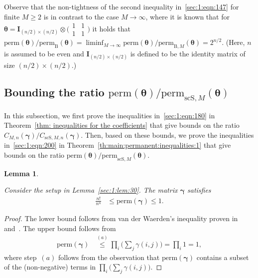 \documentclass[journal,lettersize,twocolumn]{IEEEtran} %
\newtheorem{lemma}[theorem]{Lemma}
\newcommand{\vect}[1]{ \bm{#1} }
\newcommand{\vgam}{ \vect{\gamma} }
\newcommand{\matr}[1]{ \bm{#1} }
\newcommand{\perm}{ \mathrm{perm} }
\newcommand{\permb}{ \mathrm{perm}_{\mathrm{B}} }
\newcommand{\permbM}[1]{\perm_{ \mathrm{B}, #1 }}
\newcommand{\permscsM}[1]{ \mathrm{perm}_{\mathrm{scS},#1} }
\newcommand{\CM}[1]{\Cgen{M}{#1}}
\newcommand{\Cgen}[2]{C_{#1,#2}}
\newcommand{\CscSgen}[2]{C_{\mathrm{scS},#1,#2}}
\newcommand{\mtheta}{\matr{\theta}}
\begin{document}
%

Observe that the non-tightness of the second inequality
in~\eqref{sec:1:eqn:147} for finite $M \geq 2$ is in contrast to the case
$M \to \infty$, where it is known that for
$\mtheta = \matr{I}_{(n/2) \times (n/2)} \otimes \bigl( \begin{smallmatrix} 1
  & 1 \\ 1 & 1 \end{smallmatrix} \bigr)$ it holds that
$\perm(\mtheta) / \permb(\mtheta) = \liminf_{M \to \infty} \perm(\mtheta) /
\permbM{M}(\mtheta)= 2^{n/2}$. (Here, $n$ is assumed to be even and
$\matr{I}_{(n/2) \times (n/2)}$ is defined to be the identity matrix of size
$(n/2) \times (n/2)$.)

%
%

\subsection{\texorpdfstring{Bounding the ratio $\perm(\mtheta) /  
                                                                                     \permscsM{M}(\mtheta)$}{}}

%

In this subsection, we first prove the inequalities in~\eqref{sec:1:eqn:180}
in Theorem~\ref{thm: inequalities for the coefficients} that give bounds on
the ratio $\CM{n}(\vgam) / \CscSgen{M}{n}(\vgam)$. Then, based on these
bounds, we prove the inequalities in~\eqref{sec:1:eqn:200} in
Theorem~\ref{th:main:permanent:inequalities:1} that give bounds on the ratio
$\perm(\mtheta) / \permscsM{M}(\mtheta)$.

%

\begin{lemma}
  \label{sec:1:lem:36}

  Consider the setup in Lemma~\ref{sec:1:lem:30}. The matrix $\vgam$ satisfies
  \begin{align*}
    \frac{n!}{n^{n}}
      &\leq 
         \perm(\vgam)
       \leq 1.
  \end{align*}
\end{lemma}

%

\begin{proof}
  The lower bound follows from van der Waerden's inequality proven
  in~\cite[Theorem 1]{Egorychev1981} and~\cite[Theorem 1]{Falikman1981}. The
  upper bound follows from
  \begin{align*}
    \perm(\vgam) 
      &\overset{(a)}{\leq }
         \prod_{i} 
           \Biggl( \sum_{j} \gamma(i,j) \Biggr)
       = 
         \prod_{i} 
           1
       = 1,
  \end{align*}
  where step~$(a)$ follows from the observation that $\perm(\vgam)$ contains a
  subset of the (non-negative) terms in
  $\prod_{i} \bigl( \sum_{j} \gamma(i,j) \bigr)$.
\end{proof}
\end{document}
